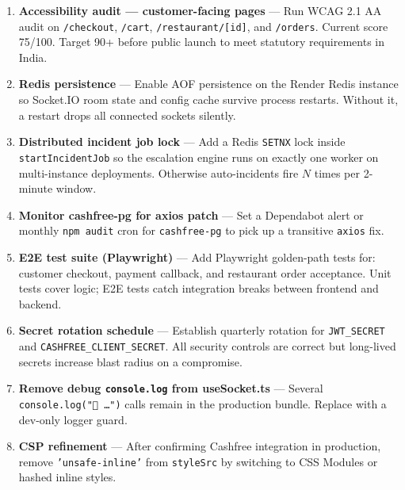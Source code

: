 \documentclass[11pt,a4paper]{article}
\begin{document}
\begin{enumerate}[leftmargin=*,label=\textbf{R\arabic*.},itemsep=8pt]

  \item \textbf{Accessibility audit — customer-facing pages} ---
    Run WCAG 2.1 AA audit on \texttt{/checkout}, \texttt{/cart},
    \texttt{/restaurant/[id]}, and \texttt{/orders}. Current score 75/100.
    Target 90+ before public launch to meet statutory requirements in India.

  \item \textbf{Redis persistence} ---
    Enable AOF persistence on the Render Redis instance so Socket.IO room
    state and config cache survive process restarts. Without it, a restart
    drops all connected sockets silently.

  \item \textbf{Distributed incident job lock} ---
    Add a Redis \texttt{SETNX} lock inside \texttt{startIncidentJob} so the
    escalation engine runs on exactly one worker on multi-instance deployments.
    Otherwise auto-incidents fire $N$ times per 2-minute window.

  \item \textbf{Monitor cashfree-pg for axios patch} ---
    Set a Dependabot alert or monthly \texttt{npm audit} cron for
    \texttt{cashfree-pg} to pick up a transitive \texttt{axios} fix.

  \item \textbf{E2E test suite (Playwright)} ---
    Add Playwright golden-path tests for: customer checkout, payment callback,
    and restaurant order acceptance. Unit tests cover logic; E2E tests catch
    integration breaks between frontend and backend.

  \item \textbf{Secret rotation schedule} ---
    Establish quarterly rotation for \texttt{JWT\_SECRET} and
    \texttt{CASHFREE\_CLIENT\_SECRET}. All security controls are correct but
    long-lived secrets increase blast radius on a compromise.

  \item \textbf{Remove debug \texttt{console.log} from useSocket.ts} ---
    Several \texttt{console.log("📡 …")} calls remain in the production bundle.
    Replace with a dev-only logger guard.

  \item \textbf{CSP refinement} ---
    After confirming Cashfree integration in production, remove
    \texttt{'unsafe-inline'} from \texttt{styleSrc} by switching to
    CSS Modules or hashed inline styles.

\end{enumerate}
\end{document}
